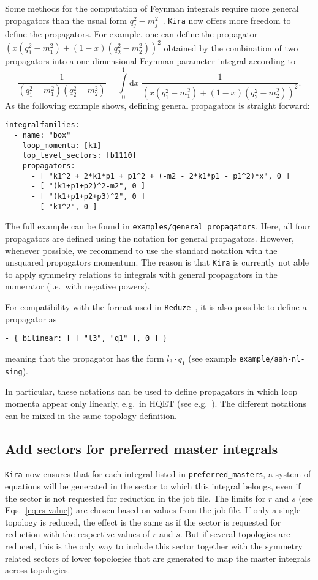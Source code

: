 \documentclass[11pt,a4paper,DIV=11,numbers=noenddot,parskip=half]{scrartcl}
\newcommand{\code}[1]{\texttt{#1}}
\newcommand*{\kira}{\code{Kira}}
\begin{document}
Some methods for the computation of Feynman integrals require more general propagators than the usual form $q_j^2-m_j^2$~\cite{Papadopoulos:2014hla,Hidding:2017jkk,Papadopoulos:2019iam}.
\kira{} now offers more freedom to define the propagators.
For example, one can define the propagator $(x (q_1^2 - m_1^2) + (1-x) (q_2^2 - m_2^2))^2$ obtained by the combination of two propagators into a one-dimensional Feynman-parameter integral according to
\begin{equation}
  \frac{1}{(q_1^2 - m_1^2) (q_2^2 - m_2^2)}
  = \int\limits_0^1\mathrm{d}x\;\frac{1}{(x (q_1^2 - m_1^2) + (1-x) (q_2^2 - m_2^2))^2}.
\end{equation}
As the following example shows, defining general propagators is straight forward:
\begin{verbatim}
integralfamilies:
  - name: "box"
    loop_momenta: [k1]
    top_level_sectors: [b1110]
    propagators:
      - [ "k1^2 + 2*k1*p1 + p1^2 + (-m2 - 2*k1*p1 - p1^2)*x", 0 ]
      - [ "(k1+p1+p2)^2-m2", 0 ]
      - [ "(k1+p1+p2+p3)^2", 0 ]
      - [ "k1^2", 0 ]
\end{verbatim}
The full example can be found in \code{examples/general\_propagators}.
Here, all four propagators are defined using the notation for general propagators.
However, whenever possible, we recommend to use the standard notation with the unsquared propagators momentum.
The reason is that \kira{} is currently not able to apply symmetry relations to integrals with general propagators in the numerator (i.e.\ with negative powers).

For compatibility with the format used in \code{Reduze}~\cite{vonManteuffel:2012np}, it is also possible to define a propagator as
\begin{verbatim}
- { bilinear: [ [ "l3", "q1" ], 0 ] }
\end{verbatim}
meaning that the propagator has the form $l_3\cdot q_1$ (see example \code{example/aah-nl-sing}).

In particular, these notations can be used to define propagators in which loop momenta appear only linearly, e.g.\ in HQET (see e.g.\ \cite{Grozin:2004yc}).
The different notations can be mixed in the same topology definition.


\subsection{Add sectors for preferred master integrals}
\label{subsect:add-missing-sectors}

\kira{} now ensures that for each integral listed in \code{preferred\_masters}, a system of equations will be generated in the sector to which this integral belongs, even if the sector is not requested for reduction in the job file.
The limits for $r$ and $s$ (see Eqs.~\eqref{eq:rs-value}) are chosen based on values from the job file.
If only a single topology is reduced, the effect is the same as if the sector is requested for reduction with the respective values of $r$ and $s$.
But if several topologies are reduced, this is the only way to include this sector together with the symmetry related sectors of lower topologies that are generated to map the master integrals across topologies.
\end{document}

